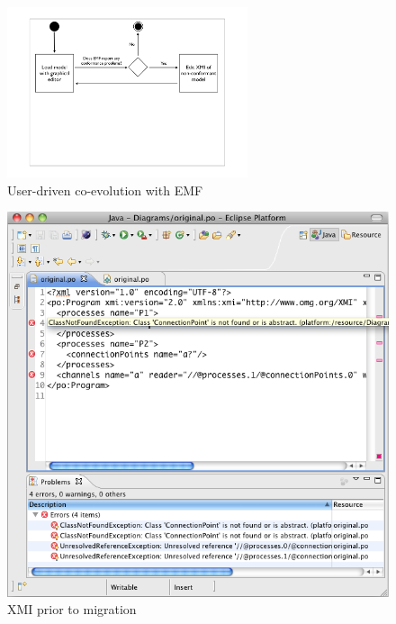 \begin{figure}[htbp]
	\centering
		\includegraphics*[viewport=85 280 750 550,height=5cm]{6.Evaluation/images/user_driven/emf_process.pdf}
	\caption{User-driven co-evolution with EMF}
	\label{fig:emf_process}
\end{figure}


\begin{figure}[htbp]
	\centering
	\includegraphics[width=13.5cm]{6.Evaluation/images/user_driven/po_original_xmi.png}
	\caption{XMI prior to migration}
	\label{fig:po_original_xmi}
\end{figure}

